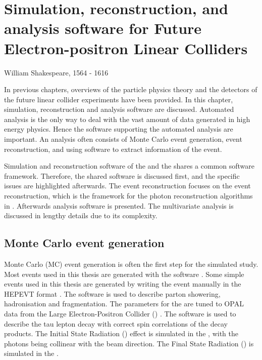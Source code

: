 \chapter{Simulation, reconstruction, and analysis software for Future Electron-positron Linear Colliders}
\label{chap:Reconstruction}

%
{William Shakespeare, 1564 - 1616}%


In previous chapters, overviews of the particle physics theory and the detectors of the future linear collider experiments have been provided. In this chapter, simulation, reconstruction and analysis software are discussed. Automated analysis is the only way to deal with the vast amount of data generated in high energy physics. Hence the software supporting the automated analysis are important. An analysis often consists of  Monte Carlo event generation, event reconstruction, and using software to extract information of the event.

Simulation and reconstruction software of the  \ILC and the \CLIC shares a  common software framework.  Therefore,  the shared  software is discussed first, and the \CLIC specific issues are highlighted afterwards. The event reconstruction focuses on the \pandora event reconstruction, which is the framework for the photon reconstruction algorithms in . Afterwards analysis software is presented.   The multivariate analysis  is discussed  in lengthy details due to its complexity.

\section{Monte Carlo event generation}
\label{sec:pandoraMC}
Monte Carlo (MC) event generation is often the first step for the simulated study. Most events used in this thesis are generated with the \WHIZARD software \cite{whizard,Moretti:2001zz}. Some simple events used in this thesis are generated by writing the event manually in the  HEPEVT format \cite{Altarelli:1989hx}. The \PYTHIA software \cite{Sjostrand:1995iq} is used to describe parton showering, hadronisation and fragmentation. The parameters for the \PYTHIA are tuned to OPAL data from the Large Electron-Positron Collider (\LEP) \cite{Alexander:1995bk}. The \TAUOLA software \cite{Jadach:1993hs} is used to describe the tau lepton decay with correct spin correlations of the decay products. The Initial State Radiation (\ISR) effect is simulated in the \WHIZARD, with the \ISR photons being collinear with the beam direction. The Final State Radiation (\FSR) is simulated in the \PYTHIA.


